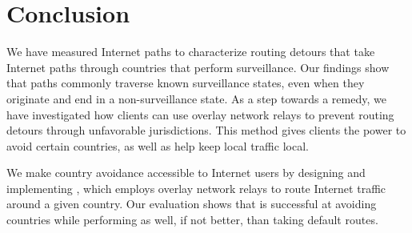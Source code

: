 \section{Conclusion}
\label{conclusion}

We have measured Internet paths to characterize routing
detours that take Internet paths through countries that perform
surveillance.  Our findings show that paths commonly traverse known
surveillance states, even when they originate and end in a
non-surveillance state.  As a step towards a remedy, we have
investigated how clients can use overlay network relays to prevent routing detours through
unfavorable jurisdictions.  This method gives clients the power to
avoid certain countries, as well as help keep local traffic local.

We make country avoidance accessible to Internet users by designing 
and implementing \system{}, which employs overlay network relays to 
route Internet traffic around a given country.  Our evaluation shows 
that \system{} is successful at avoiding countries while performing 
as well, if not better, than taking default routes.

